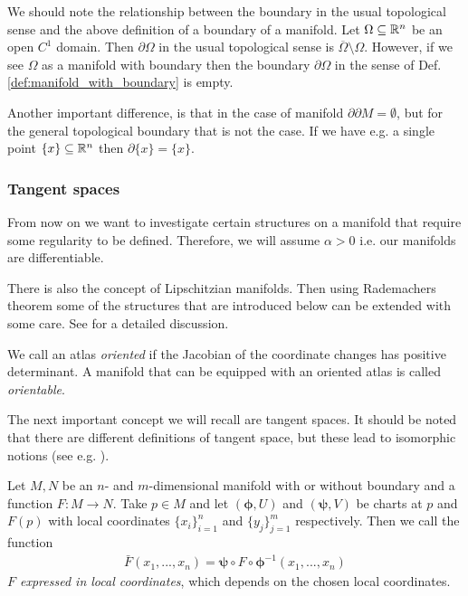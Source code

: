 \documentclass[../master_thesis.tex]{subfiles}
\begin{document}
\begin{remark}
    We should note the relationship between the boundary in the usual topological sense 
    and the above definition of a boundary of a manifold. Let $\Omega \subseteq \mathbb{R}^n$ be 
    an open $C^1$ domain. Then $\partial \Omega$ in the usual topological sense 
    is $\overline{\Omega} \setminus \Omega$. However, if we see $\Omega$ 
    as a manifold with boundary then the boundary $\partial \Omega$ in the sense of 
    Def. \ref{def:manifold_with_boundary} is empty. 

    Another important difference, is that in the case of manifold $\partial \partial M = \emptyset$,
    but for the general topological boundary that is not the case. If we have e.g. a single 
    point $\{ x \} \subseteq \mathbb{R}^n$ then $\partial \{x \} = \{ x \}$.   
\end{remark}

\subsubsection{Tangent spaces}\label{sec:tangent_spaces}

From now on we want to investigate certain structures on a manifold 
that require some regularity to be defined. Therefore, 
we will assume $\alpha > 0$ i.e. our manifolds are 
differentiable.

\begin{remark}
    There is also the concept of Lipschitzian manifolds. Then using Rademachers 
    theorem some of the structures that are introduced below can be extended 
    with some care. See \cite{lipschitz_manifolds} for a detailed discussion.
\end{remark}

\begin{definition}
    We call an atlas \textit{oriented} if the Jacobian of the coordinate
    changes has positive determinant. A manifold that can be equipped with 
    an oriented atlas is called \textit{orientable}.
\end{definition}


The next important concept we will recall are tangent spaces. 
It should be noted that there are different definitions of tangent space, but
these lead to isomorphic notions 
(see e.g. \cite[Sec.\,1.B]{riemannian_geometry}).

\begin{definition}
    Let $M, N$ be an $n$- and $m$-dimensional manifold with or without boundary 
    and a function $F: M \rightarrow N$. Take $p \in M$ and let $(\boldsymbol{\phi}, U)$ 
    and $(\boldsymbol{\psi},V)$ be charts at $p$ and $F(p)$ with local 
    coordinates $\{x_i\}_{i=1}^n$ and $\{y_j\}_{j=1}^m$ respectively. 
    Then we call the function 
    \begin{align*}
        \bar{F} (x_1,...,x_n) = \boldsymbol{\psi} \circ F \circ \boldsymbol{\phi}^{-1}(x_1,...,x_n)        
    \end{align*}
    \textit{$F$ expressed in local coordinates}, which depends
    on the chosen local coordinates.
\end{definition}
\end{document}
